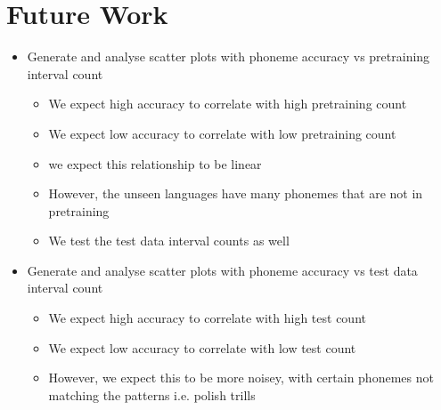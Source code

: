 \fi

\newpage
\section{Future Work}
\begin{itemize}
    \iffalse
    \item Generate and analyse scatter plots with phoneme accuracy vs  pretraining interval count
    \begin{itemize}
        \item We expect high accuracy to correlate with high pretraining count
        \item We expect low accuracy to correlate with low pretraining count
        \item we expect this relationship to be linear
        \item However, the unseen languages have many phonemes that are not in pretraining
        \item We test the test data interval counts as well
    \end{itemize}
    \item Generate and analyse scatter plots with phoneme accuracy vs  test data interval count
    \begin{itemize}
        \item We expect high accuracy to correlate with high test count
        \item We expect low accuracy to correlate with low test count
        \item However, we expect this to be more noisey, with certain phonemes not matching the patterns i.e. polish trills
    \end{itemize}
    

\end{itemize}

